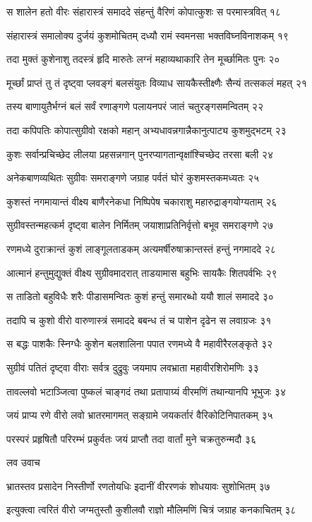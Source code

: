 स शालेन हतो वीरः संहारास्त्रं समाददे
संहन्तुं वैरिणं कोपात्कुशः स परमास्त्रवित् १८

संहारास्त्रं समालोक्य दुर्जयं कुशमोचितम्
दध्यौ रामं स्वमनसा भक्तविघ्नविनाशकम् १९

तदा मुक्तं कुशेनाशु तदस्त्रं हृदि मारुतेः
लग्नं महाव्यथाकारि तेन मूर्च्छामितः पुनः २०

मूर्च्छां प्राप्तं तु तं दृष्ट्वा प्लवङ्गं बलसंयुतः
विव्याध सायकैस्तीक्ष्णैः सैन्यं तत्सकलं महत् २१

तस्य बाणायुतैर्भग्नं बलं सर्वं रणाङ्गणे
पलायनपरं जातं चतुरङ्गसमन्वितम् २२

तदा कपिपतिः कोपात्सुग्रीवो रक्षको महान्
अभ्यधावन्नगान्नैकानुत्पाट्य कुशमुद्भटम् २३

कुशः सर्वान्प्रचिच्छेद लीलया प्रहसन्नगान्
पुनरप्यागतान्वृक्षांश्चिच्छेद तरसा बली २४

अनेकबाणव्यथितः सुग्रीवः समराङ्गणे
जग्राह पर्वतं घोरं कुशमस्तकमध्यतः २५

कुशस्तं नगमायान्तं वीक्ष्य बाणैरनेकधा
निष्पिपेष चकाराशु महारुद्राङ्गयोग्यताम् २६

सुग्रीवस्तन्महत्कर्म दृष्ट्वा बालेन निर्मितम्
जयाशाप्रतिनिर्वृत्तो बभूव समराङ्गणे २७

रणमध्ये दुराक्रान्तं कुशं लाङ्गूलताडकम्
अत्यमर्षीरुषाक्रान्तस्तं हन्तुं नगमाददे २८

आत्मानं हन्तुमुद्युक्तं वीक्ष्य सुग्रीवमादरात्
ताडयामास बहुभिः सायकैः शितपर्वभिः २९

स ताडितो बहुविधैः शरैः पीडासमन्वितः
कुशं हन्तुं समारब्धो ययौ शालं समाददे ३०

तदापि च कुशो वीरो वारुणास्त्रं समाददे
बबन्ध तं च पाशेन दृढेन स लवाग्रजः ३१

स बद्धः पाशकैः स्निग्धैः कुशेन बलशालिना
पपात रणमध्ये वै महावीरैरलङ्कृते ३२

सुग्रीवं पतितं दृष्ट्वा वीराः सर्वत्र दुद्रुवुः
जयमाप लवभ्राता महावीरशिरोमणिः ३३

तावल्लवो भटाञ्जित्वा पुष्कलं चाङ्गदं तथा
प्रतापाग्र्यं वीरमणिं तथान्यानपि भूभुजः ३४

जयं प्राप्य रणे वीरो लवो भ्रातरमागमत्
सङ्ग्रामे जयकर्तारं वैरिकोटिनिपातकम् ३५

परस्परं प्रहृषितौ परिरम्भं प्रकुर्वतः
जयं प्राप्तौ तदा वार्तां मुने चक्रतुरुन्मदौ ३६

लव उवाच

भ्रातस्तव प्रसादेन निस्तीर्णो रणतोयधिः
इदानीं वीररणकं शोधयावः सुशोभितम् ३७

इत्युक्त्वा त्वरितं वीरो जग्मतुस्तौ कुशीलवौ
राज्ञो मौलिमणिं चित्रं जग्राह कनकाचितम् ३८


